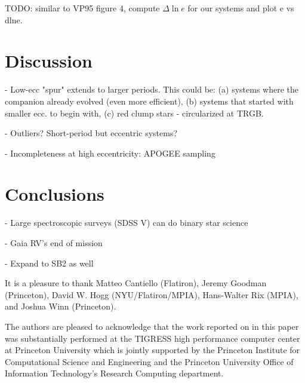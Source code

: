 \documentclass[modern, letterpaper]{aastex62}
\newcommand{\apogee}{\project{\acronym{APOGEE}}}
\newcommand{\sdssiv}{\project{\acronym{SDSS-IV}}}
\begin{document}
TODO: similar to VP95 figure 4, compute $\Delta \ln e$ for our systems and plot e vs dlne.

\section{Discussion} \label{sec:discussion}

- Low-ecc "spur" extends to larger periods. This could be: (a) systems where the companion already evolved (even more efficient), (b) systems that started with smaller ecc. to begin with, (c) red clump stars - circularized at TRGB.

- Outliers? Short-period but eccentric systems?

- Incompleteness at high eccentricity: APOGEE sampling


\section{Conclusions}

- Large spectroscopic surveys (SDSS V) can do binary star science

- Gaia RV's end of mission

- Expand to SB2 as well


\acknowledgements

It is a pleasure to thank
Matteo Cantiello (Flatiron),
Jeremy Goodman (Princeton),
David W. Hogg (NYU/Flatiron/MPIA),
Hans-Walter Rix (MPIA),
and Joshua Winn (Princeton).

The authors are pleased to acknowledge that the work reported on in this
paper was substantially performed at the TIGRESS high performance computer
center at Princeton University which is jointly supported by the Princeton
Institute for Computational Science and Engineering and the Princeton
University Office of Information Technology's Research Computing department.


\facility{\sdssiv, \apogee}

\clearpage



\end{document}
